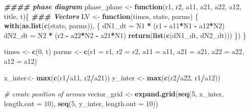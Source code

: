 \documentclass[
]{book}
\newenvironment{Shaded}{\begin{snugshade}}{\end{snugshade}}
\newcommand{\AttributeTok}[1]{\textcolor[rgb]{0.13,0.29,0.53}{#1}}
\newcommand{\CommentTok}[1]{\textcolor[rgb]{0.56,0.35,0.01}{\textit{#1}}}
\newcommand{\ControlFlowTok}[1]{\textcolor[rgb]{0.13,0.29,0.53}{\textbf{#1}}}
\newcommand{\DecValTok}[1]{\textcolor[rgb]{0.00,0.00,0.81}{#1}}
\newcommand{\DocumentationTok}[1]{\textcolor[rgb]{0.56,0.35,0.01}{\textbf{\textit{#1}}}}
\newcommand{\FunctionTok}[1]{\textcolor[rgb]{0.13,0.29,0.53}{\textbf{#1}}}
\newcommand{\NormalTok}[1]{#1}
\newcommand{\OtherTok}[1]{\textcolor[rgb]{0.56,0.35,0.01}{#1}}
\newcommand{\SpecialCharTok}[1]{\textcolor[rgb]{0.81,0.36,0.00}{\textbf{#1}}}
\begin{document}
\begin{Shaded}
\begin{Highlighting}[]
\DocumentationTok{\#\#\#\# phase diagram}
\NormalTok{phase\_plane }\OtherTok{\textless{}{-}} \ControlFlowTok{function}\NormalTok{(r1, r2, a11, a21, a22, a12, title, t)\{}
    \DocumentationTok{\#\#\# Vectors}
\NormalTok{  LV }\OtherTok{\textless{}{-}} \ControlFlowTok{function}\NormalTok{(times, state, parms) \{}
    \FunctionTok{with}\NormalTok{(}\FunctionTok{as.list}\NormalTok{(}\FunctionTok{c}\NormalTok{(state, parms)), \{}
\NormalTok{      dN1\_dt }\OtherTok{=}\NormalTok{ N1 }\SpecialCharTok{*}\NormalTok{ (r1 }\SpecialCharTok{{-}}\NormalTok{ a11}\SpecialCharTok{*}\NormalTok{N1 }\SpecialCharTok{{-}}\NormalTok{ a12}\SpecialCharTok{*}\NormalTok{N2)}
\NormalTok{      dN2\_dt }\OtherTok{=}\NormalTok{ N2 }\SpecialCharTok{*}\NormalTok{ (r2 }\SpecialCharTok{{-}}\NormalTok{ a22}\SpecialCharTok{*}\NormalTok{N2 }\SpecialCharTok{{-}}\NormalTok{ a21}\SpecialCharTok{*}\NormalTok{N1)}
      \FunctionTok{return}\NormalTok{(}\FunctionTok{list}\NormalTok{(}\FunctionTok{c}\NormalTok{(dN1\_dt, dN2\_dt)))}
\NormalTok{    \})}
\NormalTok{  \}}

\NormalTok{  times }\OtherTok{\textless{}{-}} \FunctionTok{c}\NormalTok{(}\DecValTok{0}\NormalTok{, t)}
\NormalTok{  parms }\OtherTok{\textless{}{-}} \FunctionTok{c}\NormalTok{(}\AttributeTok{r1 =}\NormalTok{ r1, }\AttributeTok{r2 =}\NormalTok{ r2, }\AttributeTok{a11 =}\NormalTok{ a11, }\AttributeTok{a21 =}\NormalTok{ a21, }\AttributeTok{a22 =}\NormalTok{ a22, }\AttributeTok{a12 =}\NormalTok{ a12)}

\NormalTok{  x\_inter}\OtherTok{\textless{}{-}} \FunctionTok{max}\NormalTok{(}\FunctionTok{c}\NormalTok{(r1}\SpecialCharTok{/}\NormalTok{a11, r2}\SpecialCharTok{/}\NormalTok{a21))}
\NormalTok{  y\_inter }\OtherTok{\textless{}{-}} \FunctionTok{max}\NormalTok{(}\FunctionTok{c}\NormalTok{(r2}\SpecialCharTok{/}\NormalTok{a22, r1}\SpecialCharTok{/}\NormalTok{a12))}

  \CommentTok{\# create position of arrows}
\NormalTok{  vector\_grid }\OtherTok{\textless{}{-}} \FunctionTok{expand.grid}\NormalTok{(}\FunctionTok{seq}\NormalTok{(}\DecValTok{5}\NormalTok{, x\_inter, }\AttributeTok{length.out =} \DecValTok{10}\NormalTok{),}
                             \FunctionTok{seq}\NormalTok{(}\DecValTok{5}\NormalTok{, y\_inter, }\AttributeTok{length.out =} \DecValTok{10}\NormalTok{))}


\end{Highlighting}
\end{Shaded}
\end{document}
